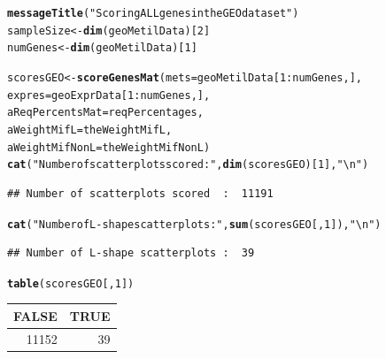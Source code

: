 \documentclass[a4paper,10pt]{article}\usepackage[]{graphicx}\usepackage[]{xcolor}
\makeatletter
\newcommand{\hlnum}[1]{\textcolor[rgb]{0.686,0.059,0.569}{#1}}%
\newcommand{\hlstr}[1]{\textcolor[rgb]{0.192,0.494,0.8}{#1}}%
\newcommand{\hlopt}[1]{\textcolor[rgb]{0,0,0}{#1}}%
\newcommand{\hlstd}[1]{\textcolor[rgb]{0.345,0.345,0.345}{#1}}%
\newcommand{\hlkwb}[1]{\textcolor[rgb]{0.69,0.353,0.396}{#1}}%
\newcommand{\hlkwc}[1]{\textcolor[rgb]{0.333,0.667,0.333}{#1}}%
\newcommand{\hlkwd}[1]{\textcolor[rgb]{0.737,0.353,0.396}{\textbf{#1}}}%
\newenvironment{kframe}{%
 \def\at@end@of@kframe{}%
 \ifinner\ifhmode%
  \def\at@end@of@kframe{\end{minipage}}%
  \begin{minipage}{\columnwidth}%
 \fi\fi%
 \def\FrameCommand##1{\hskip\@totalleftmargin \hskip-\fboxsep
 \colorbox{shadecolor}{##1}\hskip-\fboxsep
     \hskip-\linewidth \hskip-\@totalleftmargin \hskip\columnwidth}%
 \MakeFramed {\advance\hsize-\width
   \@totalleftmargin\z@ \linewidth\hsize
   \@setminipage}}%
 {\par\unskip\endMakeFramed%
 \at@end@of@kframe}
\newenvironment{knitrout}{}{} %
\makeatother
\begin{document}
\begin{knitrout}
\color{fgcolor}\begin{kframe}
\begin{alltt}
\hlkwd{messageTitle}\hlstd{(}\hlstr{"Scoring ALL genes in the GEO dataset"}\hlstd{)}
\hlstd{sampleSize} \hlkwb{<-} \hlkwd{dim}\hlstd{(geoMetilData)[}\hlnum{2}\hlstd{]}
\hlstd{numGenes} \hlkwb{<-}   \hlkwd{dim}\hlstd{(geoMetilData)[}\hlnum{1}\hlstd{]}

\hlstd{scoresGEO} \hlkwb{<-} \hlkwd{scoreGenesMat} \hlstd{(}\hlkwc{mets}\hlstd{=geoMetilData[}\hlnum{1}\hlopt{:}\hlstd{numGenes,],}
                            \hlkwc{expres}\hlstd{=geoExprData[}\hlnum{1}\hlopt{:}\hlstd{numGenes,],}
                            \hlkwc{aReqPercentsMat}\hlstd{=reqPercentages,}
                            \hlkwc{aWeightMifL}\hlstd{=theWeightMifL,}
                            \hlkwc{aWeightMifNonL}\hlstd{=theWeightMifNonL )}
\hlkwd{cat}\hlstd{(}\hlstr{"Number of scatterplots scored  : "}\hlstd{,} \hlkwd{dim}\hlstd{(scoresGEO)[}\hlnum{1}\hlstd{],} \hlstr{"\textbackslash{}n"}\hlstd{)}
\end{alltt}
\begin{verbatim}
## Number of scatterplots scored  :  11191
\end{verbatim}
\begin{alltt}
\hlkwd{cat}\hlstd{(}\hlstr{"Number of L-shape scatterplots : "}\hlstd{,} \hlkwd{sum}\hlstd{(scoresGEO[,}\hlnum{1}\hlstd{]),} \hlstr{"\textbackslash{}n"}\hlstd{)}
\end{alltt}
\begin{verbatim}
## Number of L-shape scatterplots :  39
\end{verbatim}
\begin{alltt}
\hlkwd{table}\hlstd{(scoresGEO[,}\hlnum{1}\hlstd{])}
\end{alltt}
\end{kframe}


\begin{tabular}{r|r}
\hline
FALSE & TRUE\\
\hline
11152 & 39\\
\hline
\end{tabular}
\end{knitrout}
\end{document}
